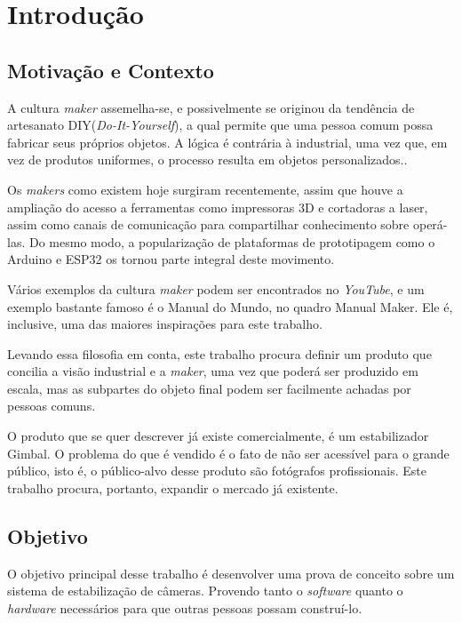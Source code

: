 \chapter{Introdução}\label{CAP:introducao}

\section{Motivação e Contexto}
A cultura \textit{maker} assemelha-se, e possivelmente se originou da tendência de artesanato DIY(\textit{Do-It-Yourself}), a qual permite que uma pessoa comum possa fabricar seus próprios objetos. A lógica é contrária à industrial, uma vez que, em vez de produtos uniformes, o processo resulta em objetos personalizados.\cite{cultura_maker}.

Os \textit{makers} como existem hoje surgiram recentemente, assim que houve a ampliação do acesso a ferramentas como impressoras 3D e cortadoras a laser, assim como canais de comunicação para compartilhar conhecimento sobre operá-las. Do mesmo modo, a popularização de plataformas de prototipagem como o Arduino e ESP32 os tornou parte integral deste movimento.

Vários exemplos da cultura \textit{maker} podem ser encontrados no \textit{YouTube}, e um exemplo bastante famoso é o Manual do Mundo\cite{manual_do_mundo}, no quadro Manual Maker\cite{manual_maker}. Ele é, inclusive, uma das maiores inspirações para este trabalho.

Levando essa filosofia em conta, este trabalho procura definir um produto que concilia a visão industrial e a \textit{maker}, uma vez que poderá ser produzido em escala, mas as subpartes do objeto final podem ser facilmente achadas por pessoas comuns.

O produto que se quer descrever já existe comercialmente, é um estabilizador Gimbal. O problema do que é vendido é o fato de não ser acessível para o grande público, isto é, o público-alvo desse produto são fotógrafos profissionais. Este trabalho procura, portanto, expandir o mercado já existente.
 
\section{Objetivo}

O objetivo principal desse trabalho é desenvolver uma prova de conceito sobre um sistema de estabilização de câmeras. Provendo tanto o \textit{software} quanto o \textit{hardware} necessários para que outras pessoas possam construí-lo.

